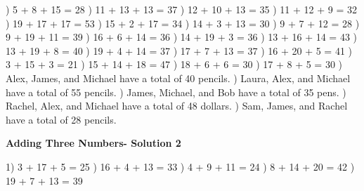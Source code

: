 \documentclass{article}%
\begin{document}
) 5 + 8 + 15 = 28%
) 11 + 13 + 13 = 37%
) 12 + 10 + 13 = 35%
) 11 + 12 + 9 = 32%
) 19 + 17 + 17 = 53%
) 15 + 2 + 17 = 34%
) 14 + 3 + 13 = 30%
) 9 + 7 + 12 = 28%
) 9 + 19 + 11 = 39%
) 16 + 6 + 14 = 36%
) 14 + 19 + 3 = 36%
) 13 + 16 + 14 = 43%
) 13 + 19 + 8 = 40%
) 19 + 4 + 14 = 37%
) 17 + 7 + 13 = 37%
) 16 + 20 + 5 = 41%
) 3 + 15 + 3 = 21%
) 15 + 14 + 18 = 47%
) 18 + 6 + 6 = 30%
) 17 + 8 + 5 = 30%
) Alex, James, and Michael have a total of 40 pencils.%
) Laura, Alex, and Michael have a total of 55 pencils.%
) James, Michael, and Bob have a total of 35 pens.%
) Rachel, Alex, and Michael have a total of 48 dollars.%
) Sam, James, and Rachel have a total of 28 pencils.%
\newline%
\newpage%
\large%
\begin{center}%
\textbf{Adding Three Numbers- Solution 2}%
\newline%
\end{center} \normalsize%
1) 3 + 17 + 5 = 25%
) 16 + 4 + 13 = 33%
) 4 + 9 + 11 = 24%
) 8 + 14 + 20 = 42%
) 19 + 7 + 13 = 39%
\newline%
\end{document}
